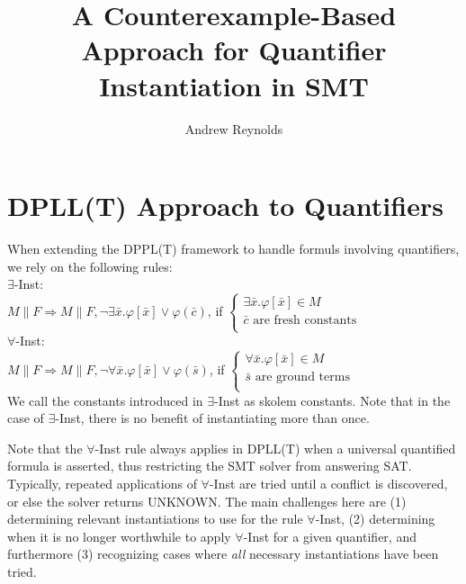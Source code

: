 \documentclass{llncs}
\begin{document}
\pagestyle{plain}

\title{A Counterexample-Based Approach for Quantifier Instantiation in SMT}

\author{Andrew Reynolds}

\date{}

\maketitle
\thispagestyle{empty}

\section{DPLL(T) Approach to Quantifiers}

When extending the DPPL(T) framework to handle formuls involving quantifiers, we rely on the following rules: \\

\noindent $\exists$-Inst: \\

$M \parallel F \Longrightarrow M \parallel F, \neg \exists \bar{x}. \varphi[ \bar{ x } ] \vee \varphi( \bar{ c } )$, if   
$\begin{cases}
  \exists \bar{x}. \varphi[ \bar{ x } ] \in M \\
  \bar{ c } \text{ are fresh constants} \\
\end{cases}$ \\

\noindent $\forall$-Inst: \\

$M \parallel F \Longrightarrow M \parallel F, \neg \forall \bar{x}. \varphi[ \bar{ x } ] \vee \varphi( \bar{ s } )$, if   
$\begin{cases}
  \forall \bar{x}. \varphi[ \bar{ x } ] \in M \\
  \bar{ s } \text{ are ground terms} \\
\end{cases}$ \\

We call the constants introduced in $\exists$-Inst as skolem constants.
Note that in the case of $\exists$-Inst, there is no benefit of instantiating more than once.

Note that the $\forall$-Inst rule always applies in DPLL(T) when a universal quantified formula is asserted, thus restricting the SMT solver from answering SAT.
Typically, repeated applications of $\forall$-Inst are tried until a conflict is discovered, or else the solver returns UNKNOWN.
The main challenges here are (1) determining relevant instantiations to use for the rule $\forall$-Inst, (2) determining when it is no longer worthwhile to apply $\forall$-Inst for a given quantifier, and furthermore (3) recognizing cases where \emph{all} necessary instantiations have been tried.
\end{document}
